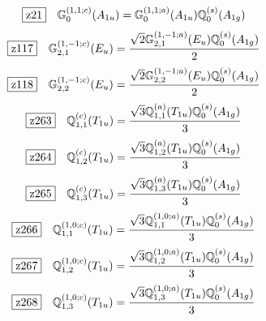 \documentclass[fleqn,10pt,landscape]{jsarticle}
\begin{document}
\begin{dmath*}
\hspace*{3mm}\fbox{z21}\quad \mathbb{G}_{0}^{(1,1;c)}(A_{1u})=\mathbb{G}_{0}^{(1,1;a)}(A_{1u}) \mathbb{Q}_{0}^{(s)}(A_{1g})
\end{dmath*}
\begin{dmath*}
\hspace*{3mm}\fbox{z117}\quad \mathbb{G}_{2,1}^{(1,-1;c)}(E_{u})=\frac{\sqrt{2} \mathbb{G}_{2,1}^{(1,-1;a)}(E_{u}) \mathbb{Q}_{0}^{(s)}(A_{1g})}{2}
\end{dmath*}
\begin{dmath*}
\hspace*{3mm}\fbox{z118}\quad \mathbb{G}_{2,2}^{(1,-1;c)}(E_{u})=\frac{\sqrt{2} \mathbb{G}_{2,2}^{(1,-1;a)}(E_{u}) \mathbb{Q}_{0}^{(s)}(A_{1g})}{2}
\end{dmath*}
\begin{dmath*}
\hspace*{3mm}\fbox{z263}\quad \mathbb{Q}_{1,1}^{(c)}(T_{1u})=\frac{\sqrt{3} \mathbb{Q}_{1,1}^{(a)}(T_{1u}) \mathbb{Q}_{0}^{(s)}(A_{1g})}{3}
\end{dmath*}
\begin{dmath*}
\hspace*{3mm}\fbox{z264}\quad \mathbb{Q}_{1,2}^{(c)}(T_{1u})=\frac{\sqrt{3} \mathbb{Q}_{1,2}^{(a)}(T_{1u}) \mathbb{Q}_{0}^{(s)}(A_{1g})}{3}
\end{dmath*}
\begin{dmath*}
\hspace*{3mm}\fbox{z265}\quad \mathbb{Q}_{1,3}^{(c)}(T_{1u})=\frac{\sqrt{3} \mathbb{Q}_{1,3}^{(a)}(T_{1u}) \mathbb{Q}_{0}^{(s)}(A_{1g})}{3}
\end{dmath*}
\begin{dmath*}
\hspace*{3mm}\fbox{z266}\quad \mathbb{Q}_{1,1}^{(1,0;c)}(T_{1u})=\frac{\sqrt{3} \mathbb{Q}_{1,1}^{(1,0;a)}(T_{1u}) \mathbb{Q}_{0}^{(s)}(A_{1g})}{3}
\end{dmath*}
\begin{dmath*}
\hspace*{3mm}\fbox{z267}\quad \mathbb{Q}_{1,2}^{(1,0;c)}(T_{1u})=\frac{\sqrt{3} \mathbb{Q}_{1,2}^{(1,0;a)}(T_{1u}) \mathbb{Q}_{0}^{(s)}(A_{1g})}{3}
\end{dmath*}
\begin{dmath*}
\hspace*{3mm}\fbox{z268}\quad \mathbb{Q}_{1,3}^{(1,0;c)}(T_{1u})=\frac{\sqrt{3} \mathbb{Q}_{1,3}^{(1,0;a)}(T_{1u}) \mathbb{Q}_{0}^{(s)}(A_{1g})}{3}
\end{dmath*}
\end{document}
